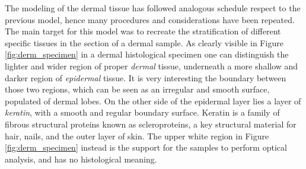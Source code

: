 The modeling of the dermal tissue has followed analogous schedule respect to the previous model, hence many procedures and considerations have been repeated. The main target for this model was to recreate the stratification of different specific tissues in the section of a dermal sample. As clearly visible in Figure \ref{fig:derm_specimen} in a dermal histological specimen one can distinguish the lighter and wider region of proper \textit{dermal} tissue, underneath a more shallow and darker region of \textit{epidermal} tissue. It is very interesting the boundary between those two regions, which can be seen as an irregular and smooth surface, populated of dermal lobes. On the other side of the epidermal layer lies a layer of \textit{keratin}, with a smooth and regular boundary surface. Keratin is a family of fibrous structural proteins known as scleroproteins, a key structural material for hair, nails, and the outer layer of skin. The upper white region in Figure \ref{fig:derm_specimen} instead is the support for the samples to perform optical analysis, and has no histological meaning.


